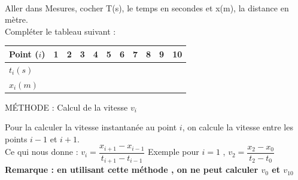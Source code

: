 \documentclass[11pt,a4paper]{article}
\renewcommand{\arraystretch}{1.5}
\begin{document}
\\
 Aller dans Mesures, cocher T(s), le temps en secondes et x(m), la distance en mètre. \\Compléter le tableau suivant : 

\begin{center}
    
\renewcommand{\arraystretch}{2}
    \begin{tabular}{|C{3cm}||C{0.8cm}|C{0.8cm}|C{0.8cm}|C{0.8cm}|C{0.8cm}|C{0.8cm}|C{0.8cm}|C{0.8cm}|C{0.8cm}|C{0.8cm}|}
         \hline
         Point ($i$) & 1 &  2& 3 & 4 & 5 & 6& 7& 8& 9 & 10\\
         \hline
         $t_i(s)$ &  &  &  &  &  & & & & & \\
         \hline
          $x_i(m)$ &  &  &  & & & & & & & \\
         \hline
 
    \end{tabular}



\begin{minipage}{0.9\textwidth}%

    

 
 \begin{bclogo}[couleur=white ,  arrondi =0.1 , logo = \bcinfo, epBarre =2]{ MÉTHODE : Calcul de la vitesse $v_i$}
\begin{center}
    

 Pour la calculer la vitesse instantanée au point $i$, on calcule la vitesse entre les points $i-1$ et $i+1$. \\[1cm]
 

 Ce qui nous donne : $v_i=\dfrac{x_{i+1}-x_{i-1}}{t_{i+1}-t_{i-1}}$   
\hspace{2cm}
 Exemple pour $i=1$ , $v_2=\dfrac{x_{2}-x_{0}}{t_{2}-t_{0}}$ \\[1cm]

\textbf{ Remarque : en utilisant cette méthode , on ne peut calculer $v_0$ et $v_{10}$}

 \end{center}
\end{bclogo}

\end{minipage}

\vfill 

\end{center}
\end{document}
